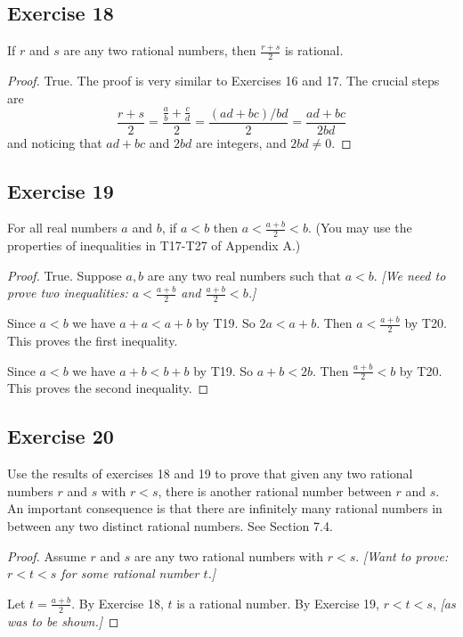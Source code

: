 \documentclass[14pt]{extarticle}
\begin{document}
\subsection{Exercise 18}
If $r$ and $s$ are any two rational numbers, then $\frac{r+s}{2}$ is rational.

\begin{proof}
True. The proof is very similar to Exercises 16 and 17. The crucial steps are
\[
\frac{r+s}{2} = \frac{\frac{a}{b} + \frac{c}{d}}{2} = \frac{(ad+bc)/bd}{2} = \frac{ad+bc}{2bd}
\]
and noticing that $ad+bc$ and $2bd$ are integers, and $2bd \neq 0$.
\end{proof}

\subsection{Exercise 19}
For all real numbers $a$ and $b$, if $a < b$ then $a < \frac{a+b}{2} < b$. (You may use the properties of inequalities in T17-T27 of Appendix A.)

\begin{proof}
True. Suppose $a,b$ are any two real numbers such that $a<b$. {\it[We need to prove two inequalities: $a < \frac{a+b}{2}$ and $\frac{a+b}{2} < b$.]}

Since $a<b$ we have $a+a < a+b$ by T19. So $2a < a+b$. Then $a < \frac{a+b}{2}$ by T20. This proves the first inequality.

Since $a<b$ we have $a+b < b+b$ by T19. So $a+b < 2b$. Then $\frac{a+b}{2} < b$ by T20. This proves the second inequality.
\end{proof}

\subsection{Exercise 20}
Use the results of exercises 18 and 19 to prove that given any two rational numbers $r$ and $s$ with $r < s$, there is another rational number between $r$ and $s$. An important consequence is that there are infinitely many rational numbers in between any two distinct rational numbers. See Section 7.4.

\begin{proof}
Assume $r$ and $s$ are any two rational numbers with $r < s$. {\it [Want to prove: $r < t < s$ for some rational number $t$.]}

Let $t = \frac{a+b}{2}$. By Exercise 18, $t$ is a rational number. By Exercise 19, $r < t < s$, {\it [as was to be shown.]}
\end{proof}
\end{document}
